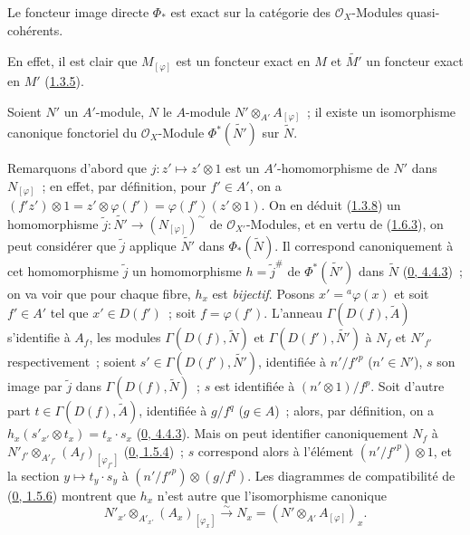\begin{corollary}[1.6.4]
\label{I.1.6.4-fr}
Le foncteur image directe $\Phi_*$ est exact sur la catégorie des
$\mathscr{O}_X$-Modules quasi-cohérents.
\end{corollary}

En effet, il est clair que $M_{[\varphi]}$ est un foncteur exact en $M$ et
$\widetilde{M'}$ un foncteur exact en $M'$ (\hyperref[I.1.3.5-fr]{1.3.5}).

\begin{proposition}[1.6.5]
\label{I.1.6.5-fr}
Soient $N'$ un $A'$-module, $N$ le $A$-module
$N'\otimes_{A'}A_{[\varphi]}$~; il existe un isomorphisme canonique
fonctoriel du $\mathscr{O}_X$-Module $\Phi^*(\widetilde{N'})$ sur
$\widetilde{N}$.
\end{proposition}

Remarquons d'abord que $j:z'\mapsto z'\otimes 1$ est un
$A'$-homomorphisme de $N'$ dans $N_{[\varphi]}$~; en effet, par définition,
pour $f'\in A'$, on a
$(f'z')\otimes 1=z'\otimes\varphi(f')=\varphi(f')(z'\otimes 1)$. On en
déduit (\hyperref[I.1.3.8-fr]{1.3.8}) un homomorphisme
$\widetilde{j}:\widetilde{N'}\to(N_{[\varphi]})^{\sim}$ de
$\mathscr{O}_{X'}$-Modules, et en vertu de
(\hyperref[I.1.6.3-fr]{1.6.3}), on peut considérer que $\widetilde{j}$
applique $\widetilde{N'}$ dans $\Phi_*(\widetilde{N})$. Il correspond
canoniquement à cet homomorphisme $\widetilde{j}$ un homomorphisme
$h=\widetilde{j}^{\#}$ de $\Phi^*(\widetilde{N'})$ dans $\widetilde{N}$
(\hyperref[0.4.4.3-fr]{0, 4.4.3})~; on va voir que pour chaque fibre,
$h_x$ est \emph{bijectif}. Posons $x'={}^a\varphi(x)$ et soit $f'\in A'$
tel que $x'\in D(f')$~; soit $f=\varphi(f')$. L'anneau
$\Gamma(D(f),\widetilde{A})$ s'identifie à $A_f$, les modules
$\Gamma(D(f),\widetilde{N})$ et $\Gamma(D(f'),\widetilde{N'})$ à $N_f$ et
$N'_{f'}$ respectivement~; soient
$s'\in\Gamma(D(f'),\widetilde{N'})$, identifiée à $n'/{f'}^p$ ($n'\in N'$),
$s$ son image par $\widetilde{j}$ dans $\Gamma(D(f),\widetilde{N})$~; $s$
est identifiée à $(n'\otimes 1)/f^p$. Soit d'autre part
$t\in\Gamma(D(f),\widetilde{A})$, identifiée à $g/f^q$ ($g\in A$)~; alors,
par définition, on a
$h_x(s'_{x'}\otimes t_x)=t_x\cdot s_x$
(\hyperref[0.4.4.3-fr]{0, 4.4.3}). Mais on peut identifier canoniquement
$N_f$ à
$N'_{f'}\otimes_{A'_{f'}}(A_f)_{[\varphi_{f'}]}$
(\hyperref[0.1.5.4-fr]{0, 1.5.4})~; $s$ correspond alors à l'élément
$(n'/{f'}^p)\otimes 1$, et la section $y\mapsto t_y\cdot s_y$ à
$(n'/{f'}^p)\otimes(g/f^q)$. Les diagrammes de compatibilité de
(\hyperref[0.1.5.6-fr]{0, 1.5.6}) montrent que $h_x$ n'est autre que
l'isomorphisme canonique
\[
  \label{I.1.6.5.1-fr}
  N'_{x'}\otimes_{A'_{x'}}(A_x)_{[\varphi_x]}
  \xrightarrow{\sim}N_x=(N'\otimes_{A'}A_{[\varphi]})_x.
  \tag{1.6.5.1}
\]

